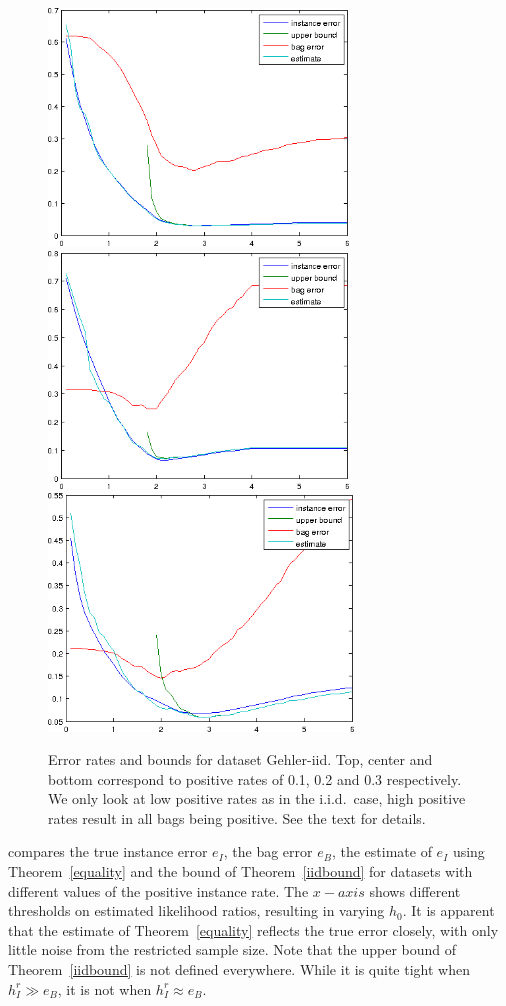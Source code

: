 \begin{figure}[tbp]
	\begin{center}
		\includegraphics[height=63mm]{images/iid_01.png}
		\includegraphics[height=63mm]{images/iid_02.png}
		\includegraphics[height=63mm]{images/iid_03.png}
	\end{center}
	\caption{Error rates and bounds for dataset Gehler-iid. Top, center and bottom correspond to positive rates of 0.1, 0.2 and 0.3 respectively.
    We only look at low positive rates as in the i.i.d.\ case, high positive rates result in all bags being positive.
    See the text for details.}
\end{figure}

 compares the true instance error $e_I$, the bag error $e_B$, the estimate of $e_I$ using Theorem~\ref{equality}
and the bound of Theorem~\ref{iidbound} for datasets with different values of the positive instance rate.
The $x-axis$ shows different thresholds on estimated likelihood ratios, resulting in varying $h_0$.
It is apparent that the estimate of Theorem~\ref{equality} reflects the true error closely, with only little noise from the restricted
sample size. Note that the upper bound of Theorem~\ref{iidbound} is not defined everywhere. While it is quite tight when
$h_I^r \gg e_B$, it is not when $h_I^r \approx e_B$.



